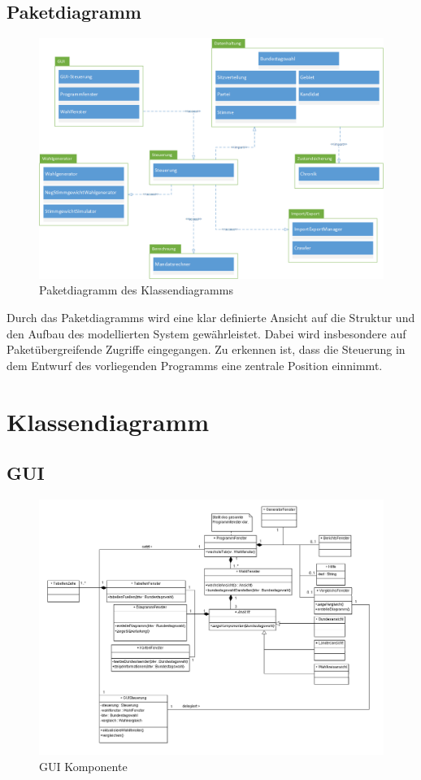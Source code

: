 \documentclass[12pt,a4paper,titlepage]{article}
\begin{document}
\subsection{Paketdiagramm}
\begin{figure}[!ht]
\centering
\includegraphics[scale=0.5]{Paketdiagramm} \caption{Paketdiagramm des Klassendiagramms}
\end{figure}
Durch das Paketdiagramms wird eine klar definierte Ansicht auf die Struktur und den Aufbau des modellierten System gewährleistet.
Dabei wird insbesondere auf Paketübergreifende Zugriffe eingegangen.
Zu erkennen ist, dass die Steuerung in dem Entwurf des vorliegenden Programms eine zentrale Position einnimmt.
\newpage
\section{Klassendiagramm}
\subsection{GUI}
\begin{figure}[!ht]
\centering
\includegraphics[scale=0.55]{GUI-Abschnitt.png} \caption{GUI Komponente} 
\end{figure}
\end{document}
